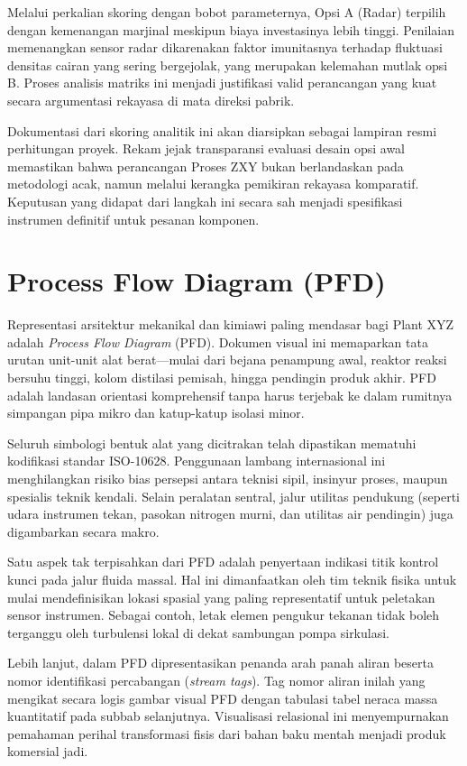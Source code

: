 \documentclass[12pt, a4paper]{report}
\begin{document}
Melalui perkalian skoring dengan bobot parameternya, Opsi A (Radar) terpilih dengan kemenangan marjinal meskipun biaya investasinya lebih tinggi. Penilaian memenangkan sensor radar dikarenakan faktor imunitasnya terhadap fluktuasi densitas cairan yang sering bergejolak, yang merupakan kelemahan mutlak opsi B. Proses analisis matriks ini menjadi justifikasi valid perancangan yang kuat secara argumentasi rekayasa di mata direksi pabrik.

Dokumentasi dari skoring analitik ini akan diarsipkan sebagai lampiran resmi perhitungan proyek. Rekam jejak transparansi evaluasi desain opsi awal memastikan bahwa perancangan Proses ZXY bukan berlandaskan pada metodologi acak, namun melalui kerangka pemikiran rekayasa komparatif. Keputusan yang didapat dari langkah ini secara sah menjadi spesifikasi instrumen definitif untuk pesanan komponen.

\section{Process Flow Diagram (PFD)}
Representasi arsitektur mekanikal dan kimiawi paling mendasar bagi Plant XYZ adalah \textit{Process Flow Diagram} (PFD). Dokumen visual ini memaparkan tata urutan unit-unit alat berat—mulai dari bejana penampung awal, reaktor reaksi bersuhu tinggi, kolom distilasi pemisah, hingga pendingin produk akhir. PFD adalah landasan orientasi komprehensif tanpa harus terjebak ke dalam rumitnya simpangan pipa mikro dan katup-katup isolasi minor.

Seluruh simbologi bentuk alat yang dicitrakan telah dipastikan mematuhi kodifikasi standar ISO-10628. Penggunaan lambang internasional ini menghilangkan risiko bias persepsi antara teknisi sipil, insinyur proses, maupun spesialis teknik kendali. Selain peralatan sentral, jalur utilitas pendukung (seperti udara instrumen tekan, pasokan nitrogen murni, dan utilitas air pendingin) juga digambarkan secara makro.

Satu aspek tak terpisahkan dari PFD adalah penyertaan indikasi titik kontrol kunci pada jalur fluida massal. Hal ini dimanfaatkan oleh tim teknik fisika untuk mulai mendefinisikan lokasi spasial yang paling representatif untuk peletakan sensor instrumen. Sebagai contoh, letak elemen pengukur tekanan tidak boleh terganggu oleh turbulensi lokal di dekat sambungan pompa sirkulasi.

Lebih lanjut, dalam PFD dipresentasikan penanda arah panah aliran beserta nomor identifikasi percabangan (\textit{stream tags}). Tag nomor aliran inilah yang mengikat secara logis gambar visual PFD dengan tabulasi tabel neraca massa kuantitatif pada subbab selanjutnya. Visualisasi relasional ini menyempurnakan pemahaman perihal transformasi fisis dari bahan baku mentah menjadi produk komersial jadi.
\end{document}
